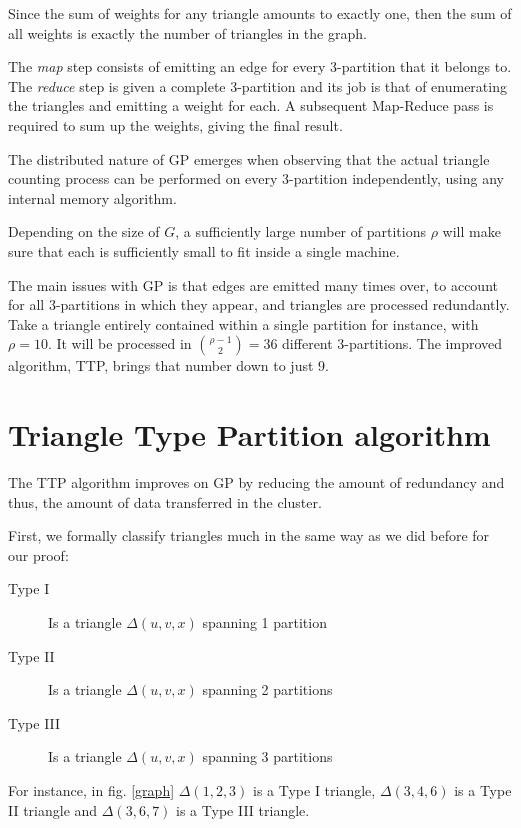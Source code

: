 \documentclass[paper=a4, fontsize=11pt]{scrartcl}
\begin{document}
Since the sum of weights for any triangle amounts to exactly one, then the sum
of all weights is exactly the number of triangles in the graph.

The \emph{map} step consists of emitting an edge for every 3-partition that it
belongs to. The \emph{reduce} step is given a complete 3-partition and its job
is that of enumerating the triangles and emitting a weight for each. A
subsequent Map-Reduce pass is required to sum up the weights, giving the final
result.

The distributed nature of GP emerges when observing that the actual triangle
counting process can be performed on every 3-partition independently, using any
internal memory algorithm.

Depending on the size of $G$, a sufficiently large number of partitions $\rho$
will make sure that each is sufficiently small to fit inside a single machine.

The main issues with GP is that edges are emitted many times over, to account
for all 3-partitions in which they appear, and triangles are processed
redundantly. Take a triangle entirely contained within a single partition for
instance, with $\rho=10$. It will be processed in $\binom{\rho-1}{2}=36$
different 3-partitions. The improved algorithm, TTP, brings that number down to
just 9.

\section{Triangle Type Partition algorithm}

The TTP algorithm \cite{park2013efficient} improves on GP by reducing the amount
of redundancy and thus, the amount of data transferred in the cluster.

First, we formally classify triangles much in the same way as we did before for
our proof:
\begin{description}
    \item[Type I] Is a triangle $\Delta(u, v, x)$ spanning 1 partition
    \item[Type II] Is a triangle $\Delta(u, v, x)$ spanning 2 partitions
    \item[Type III] Is a triangle $\Delta(u, v, x)$ spanning 3 partitions
\end{description}

For instance, in fig. \ref{graph} $\Delta(1,2,3)$ is a Type I triangle,
$\Delta(3,4,6)$ is a Type II triangle and $\Delta(3,6,7)$ is a Type III
triangle.
\end{document}
